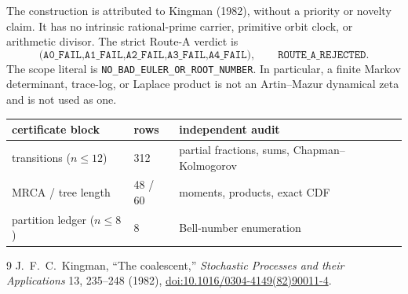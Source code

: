 \documentclass[10pt]{article}
\begin{document}
The construction is attributed to Kingman (1982), without a priority or
novelty claim.  It has no intrinsic rational-prime carrier, primitive orbit
clock, or arithmetic divisor.  The strict Route-A verdict is
\[
\texttt{(A0\_FAIL,A1\_FAIL,A2\_FAIL,A3\_FAIL,A4\_FAIL)},\qquad
\texttt{ROUTE\_A\_REJECTED}.
\]
The scope literal is \texttt{NO\_BAD\_EULER\_OR\_ROOT\_NUMBER}.
In particular, a finite Markov determinant, trace-log, or Laplace product is
not an Artin--Mazur dynamical zeta and is not used as one.

\begin{center}
\begin{tabular}{@{}lll@{}}
\toprule
certificate block & rows & independent audit \\
\midrule
transitions ($n\leq12$) & 312 & partial fractions, sums, Chapman--Kolmogorov \\
MRCA / tree length & 48 / 60 & moments, products, exact CDF \\
partition ledger ($n\leq8$) & 8 & Bell-number enumeration \\
\bottomrule
\end{tabular}
\end{center}

\begin{thebibliography}{9}\small
{} J.~F.~C.~Kingman, ``The coalescent,'' \emph{Stochastic
Processes and their Applications} 13, 235--248 (1982),
\href{https://doi.org/10.1016/0304-4149(82)90011-4}{doi:10.1016/0304-4149(82)90011-4}.
\end{thebibliography}
\end{document}
